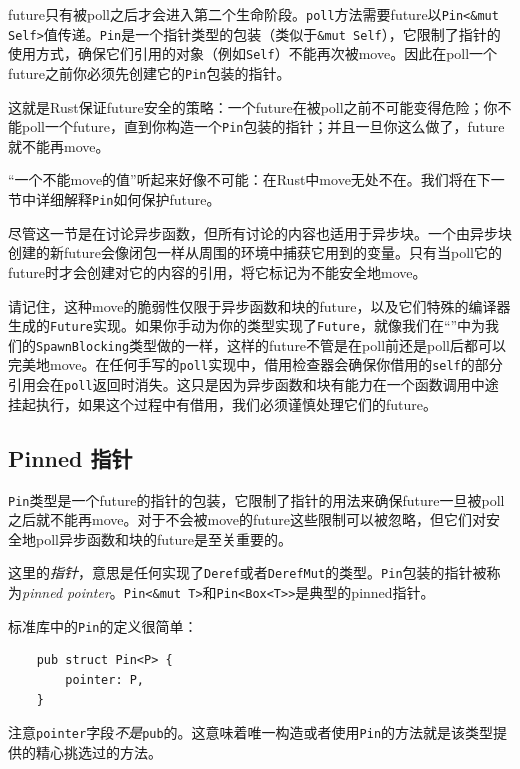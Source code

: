 future只有被poll之后才会进入第二个生命阶段。\texttt{poll}方法需要future以\texttt{Pin<\&mut Self>}值传递。\texttt{Pin}是一个指针类型的包装（类似于\texttt{\&mut Self}），它限制了指针的使用方式，确保它们引用的对象（例如\texttt{Self}）不能再次被move。因此在poll一个future之前你必须先创建它的\texttt{Pin}包装的指针。

这就是Rust保证future安全的策略：一个future在被poll之前不可能变得危险；你不能poll一个future，直到你构造一个\texttt{Pin}包装的指针；并且一旦你这么做了，future就不能再move。

“一个不能move的值”听起来好像不可能：在Rust中move无处不在。我们将在下一节中详细解释\texttt{Pin}如何保护future。

尽管这一节是在讨论异步函数，但所有讨论的内容也适用于异步块。一个由异步块创建的新future会像闭包一样从周围的环境中捕获它用到的变量。只有当poll它的future时才会创建对它的内容的引用，将它标记为不能安全地move。

请记住，这种move的脆弱性仅限于异步函数和块的future，以及它们特殊的编译器生成的\texttt{Future}实现。如果你手动为你的类型实现了\texttt{Future}，就像我们在“”中为我们的\texttt{SpawnBlocking}类型做的一样，这样的future不管是在poll前还是poll后都可以完美地move。在任何手写的\texttt{poll}实现中，借用检查器会确保你借用的\texttt{self}的部分引用会在\texttt{poll}返回时消失。这只是因为异步函数和块有能力在一个函数调用中途挂起执行，如果这个过程中有借用，我们必须谨慎处理它们的future。

\subsection{Pinned 指针}
\texttt{Pin}类型是一个future的指针的包装，它限制了指针的用法来确保future一旦被poll之后就不能再move。对于不会被move的future这些限制可以被忽略，但它们对安全地poll异步函数和块的future是至关重要的。

这里的\emph{指针}，意思是任何实现了\texttt{Deref}或者\texttt{DerefMut}的类型。\texttt{Pin}包装的指针被称为\emph{pinned pointer}。\texttt{Pin<\&mut T>}和\texttt{Pin<Box<T>>}是典型的pinned指针。

标准库中的\texttt{Pin}的定义很简单：
\begin{verbatim}
    pub struct Pin<P> {
        pointer: P,
    }
\end{verbatim}

注意\texttt{pointer}字段\emph{不是}\texttt{pub}的。这意味着唯一构造或者使用\texttt{Pin}的方法就是该类型提供的精心挑选过的方法。

